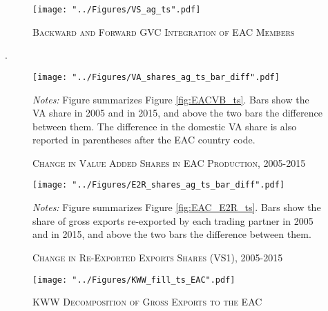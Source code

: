 \documentclass[a4paper]{article}
\begin{document}
\begin{figure}[h!]
\centering
\caption{\label{fig:VSag_ts}\textsc{Backward and Forward GVC Integration of EAC Members}}
\texttt{[image: "../Figures/VS\_ag\_ts".pdf]} %
\end{figure}
\FloatBarrier

. \vspace{15cm}

\begin{figure}[h!]
\centering
\caption{\label{fig:EACVB_ts_bar}\textsc{Change in Value Added Shares in EAC Production, 2005-2015}}
\texttt{[image: "../Figures/VA\_shares\_ag\_ts\_bar\_diff".pdf]} %
\raggedright
\scriptsize
\emph{Notes:} Figure summarizes Figure \ref{fig:EACVB_ts}. Bars show the VA share in 2005 and in 2015, and above the two bars the difference between them. The difference in the domestic VA share is also reported in parentheses after the EAC country code.
\end{figure}
\FloatBarrier

\begin{figure}[h!]
\centering
\caption{\label{fig:EAC_E2R_ts_bar}\textsc{Change in Re-Exported Exports Shares (VS1), 2005-2015}}
\texttt{[image: "../Figures/E2R\_shares\_ag\_ts\_bar\_diff".pdf]} %
\raggedright
\scriptsize
\emph{Notes:} Figure summarizes Figure \ref{fig:EAC_E2R_ts}. Bars show the share of gross exports re-exported by each trading partner in 2005 and in 2015, and above the two bars the difference between them.
\end{figure}
\FloatBarrier


%

\begin{figure}[h!] 
\centering
\caption{\label{fig:KWW_fill_ts_EAC}\textsc{KWW Decomposition of Gross Exports to the EAC}}
\texttt{[image: "../Figures/KWW\_fill\_ts\_EAC".pdf]} %
\end{figure}
\FloatBarrier
\end{document}
